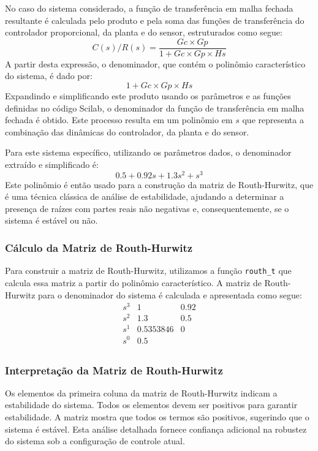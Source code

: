 No caso do sistema considerado, a função de transferência em malha fechada resultante é calculada pelo produto e pela soma das funções de transferência do controlador proporcional, da planta e do sensor, estruturados como segue:
\[
    C(s)/R(s) = \frac{Gc \times Gp}{1 + Gc \times Gp \times Hs}
\]
A partir desta expressão, o denominador, que contém o polinômio característico do sistema, é dado por:
\[
    1 + Gc \times Gp \times Hs
\]
Expandindo e simplificando este produto usando os parâmetros e as funções definidas no código Scilab, o denominador da função de transferência em malha fechada é obtido. Este processo resulta em um polinômio em \(s\) que representa a combinação das dinâmicas do controlador, da planta e do sensor.

Para este sistema específico, utilizando os parâmetros dados, o denominador extraído e simplificado é:
\[
    0.5 + 0.92s + 1.3s^2 + s^3
\]
Este polinômio é então usado para a construção da matriz de Routh-Hurwitz, que é uma técnica clássica de análise de estabilidade, ajudando a determinar a presença de raízes com partes reais não negativas e, consequentemente, se o sistema é estável ou não.



\subsubsection{Cálculo da Matriz de Routh-Hurwitz}

Para construir a matriz de Routh-Hurwitz, utilizamos a função \texttt{routh\_t} que calcula essa matriz a partir do polinômio característico. A matriz de Routh-Hurwitz para o denominador do sistema é calculada e apresentada como segue:
\[
    \begin{array}{c|cc}
        s^3 & 1         & 0.92 \\
        s^2 & 1.3       & 0.5  \\
        s^1 & 0.5353846 & 0    \\
        s^0 & 0.5       &      \\
    \end{array}
\]

\subsubsection{Interpretação da Matriz de Routh-Hurwitz}

Os elementos da primeira coluna da matriz de Routh-Hurwitz indicam a estabilidade do sistema. Todos os elementos devem ser positivos para garantir estabilidade. A matriz mostra que todos os termos são positivos, sugerindo que o sistema é estável. Esta análise detalhada fornece confiança adicional na robustez do sistema sob a configuração de controle atual.

